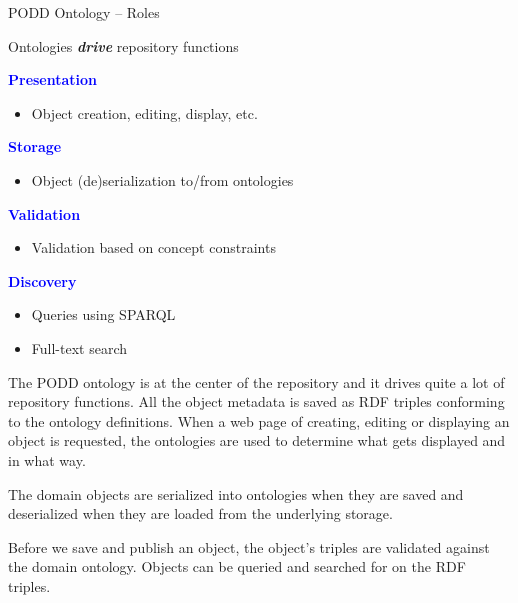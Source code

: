 \documentclass[ignorenonframetext,compress]{beamer}
\begin{document}
\begin{frame}{PODD Ontology -- Roles}
\begin{block}{Ontologies \textbf{\emph{drive}} repository functions}
\begin{list}{}{}
\item[\textcolor{blue}{\textbf{Presentation}}]~\\%
    \begin{itemize}
    \item Object creation, editing, display, etc.
    \end{itemize}
\item[\textcolor{blue}{\textbf{Storage}}] ~\\
	\begin{itemize}
	\item Object (de)serialization to/from ontologies
	\end{itemize}
\item[\textcolor{blue}{\textbf{Validation}}] ~\\%
    \begin{itemize}
    \item Validation based on concept constraints
    \end{itemize}
\item[\textcolor{blue}{\textbf{Discovery}}] ~\\%
    \begin{itemize}
    \item Queries using SPARQL
    \item Full-text search
    \end{itemize}
\end{list}
\end{block}
\end{frame}

The PODD ontology is at the center of the repository and it drives quite a lot
of repository functions. All the object metadata is saved as RDF triples
conforming to the ontology definitions. When a web page of creating, editing
or displaying an object is requested, the ontologies are used to determine
what gets displayed and in what way.

The domain objects are serialized into ontologies when they are saved and 
deserialized when they are loaded from the underlying storage.

Before we save and publish an object, the object's triples are validated against
the domain ontology. Objects can be queried and searched for on the RDF triples.
\end{document}
